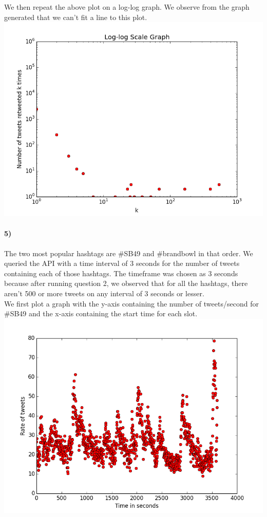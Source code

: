 \documentclass{article}
\begin{document}
We then repeat the above plot on a log-log graph. We observe from the graph generated that we can't fit 
a line to this plot.\\
\includegraphics[scale=0.6]{4log} 
\paragraph{5)}
The two most popular hashtags are \#SB49 and \#brandbowl in that order.
We queried the API with a time interval of 3 seconds for the number of tweets containing each of those hashtags.
The timeframe was chosen as 3 seconds because after running question 2, we observed that for all the hashtags, there aren't 
500 or more tweets on any interval of 3 seconds or lesser.\\
We first plot a graph with the y-axis containing the number of tweets/second for \#SB49 and the x-axis
containing the start time for each slot.\\
\includegraphics[scale=0.5]{Q3b_plot2} \\
\end{document}
